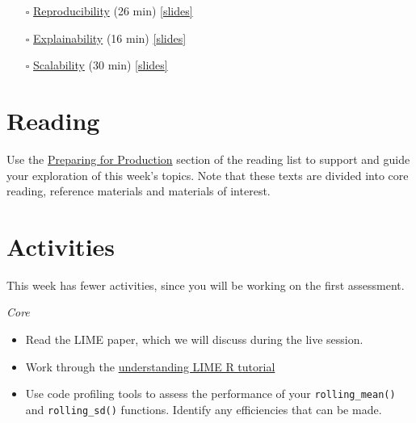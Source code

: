 \documentclass[
  12pt,
]{book}
\begin{document}
\begin{itemize}
\item[$\square$]
  \href{https://imperial.cloud.panopto.eu/Panopto/Pages/Viewer.aspx?id=f48d43b4-b370-4cfb-a438-af9e00bf79b5}{Reproducibility} (26 min) \href{https://github.com/zakvarty/effective-data-science-slides-2022/raw/main/04-01-reproducibility/04-01-reproducibility.pdf}{{[}slides{]}}
\item[$\square$]
  \href{https://imperial.cloud.panopto.eu/Panopto/Pages/Viewer.aspx?id=f2c64757-faea-470f-9dfc-af9e00ba4929}{Explainability} (16 min) \href{https://github.com/zakvarty/effective-data-science-slides-2022/raw/main/04-02-explainability/04-02-explainability.pdf}{{[}slides{]}}
\item[$\square$]
  \href{https://imperial.cloud.panopto.eu/Panopto/Pages/Viewer.aspx?id=5305fbb1-8dc9-4232-82d0-afa00187f942}{Scalability} (30 min) \href{https://github.com/zakvarty/effective-data-science-slides-2022/raw/main/04-03-scalability/04-03-scalability.pdf}{{[}slides{]}}
\end{itemize}

\hypertarget{reading-3}{%
\section{Reading}\label{reading-3}}

Use the \protect\hyperlink{production-reading}{Preparing for Production} section of the reading list to support and guide your exploration of this week's topics. Note that these texts are divided into core reading, reference materials and materials of interest.

\hypertarget{activities-1}{%
\section{Activities}\label{activities-1}}

This week has fewer activities, since you will be working on the first assessment.

\emph{Core}

\begin{itemize}
\item
  Read the LIME paper, which we will discuss during the live session.
\item
  Work through the \href{https://cran.r-project.org/web/packages/lime/vignettes/Understanding_lime.html}{understanding LIME R tutorial}
\item
  Use code profiling tools to assess the performance of your \texttt{rolling\_mean()} and \texttt{rolling\_sd()} functions. Identify any efficiencies that can be made.
\end{itemize}
\end{document}

